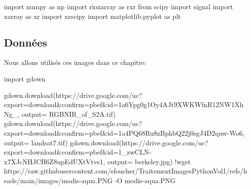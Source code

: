 \documentclass[
  11pt,
  letterpaper,
  open=any,
  twoside=false,
  french]{scrbook}
\newenvironment{Shaded}{\begin{snugshade}}{\end{snugshade}}
\newcommand{\ImportTok}[1]{\textcolor[rgb]{0.00,0.46,0.62}{#1}}
\newcommand{\NormalTok}[1]{\textcolor[rgb]{0.00,0.23,0.31}{#1}}
\newcommand{\OperatorTok}[1]{\textcolor[rgb]{0.37,0.37,0.37}{#1}}
\newcommand{\StringTok}[1]{\textcolor[rgb]{0.13,0.47,0.30}{#1}}
\begin{document}
\begin{Shaded}
\begin{Highlighting}[]
\ImportTok{import}\NormalTok{ numpy }\ImportTok{as}\NormalTok{ np}
\ImportTok{import}\NormalTok{ rioxarray }\ImportTok{as}\NormalTok{ rxr}
\ImportTok{from}\NormalTok{ scipy }\ImportTok{import}\NormalTok{ signal}
\ImportTok{import}\NormalTok{ xarray }\ImportTok{as}\NormalTok{ xr}
\ImportTok{import}\NormalTok{ xrscipy}
\ImportTok{import}\NormalTok{ matplotlib.pyplot }\ImportTok{as}\NormalTok{ plt}
\end{Highlighting}
\end{Shaded}

\subsection{Données}\label{donnuxe9es}

Nous allons utilisés ces images dans ce chapitre:

\begin{Shaded}
\begin{Highlighting}[]
\ImportTok{import}\NormalTok{ gdown}

\NormalTok{gdown.download(}\StringTok{\textquotesingle{}https://drive.google.com/uc?export=download\&confirm=pbef\&id=1a6Ypg0g1Oy4AJt9XWKWfnR12NW1XhNg\_\textquotesingle{}}\NormalTok{, output}\OperatorTok{=} \StringTok{\textquotesingle{}RGBNIR\_of\_S2A.tif\textquotesingle{}}\NormalTok{)}
\NormalTok{gdown.download(}\StringTok{\textquotesingle{}https://drive.google.com/uc?export=download\&confirm=pbef\&id=1a4PQ68Ru8zBphbQ22j0sgJ4D2quw{-}Wo6\textquotesingle{}}\NormalTok{, output}\OperatorTok{=} \StringTok{\textquotesingle{}landsat7.tif\textquotesingle{}}\NormalTok{)}
\NormalTok{gdown.download(}\StringTok{\textquotesingle{}https://drive.google.com/uc?export=download\&confirm=pbef\&id=1\_zwCLN{-}x7XJcNHJCH6Z8upEdUXtVtvs1\textquotesingle{}}\NormalTok{, output}\OperatorTok{=} \StringTok{\textquotesingle{}berkeley.jpg\textquotesingle{}}\NormalTok{)}
\OperatorTok{!}\NormalTok{wget https:}\OperatorTok{//}\NormalTok{raw.githubusercontent.com}\OperatorTok{/}\NormalTok{sfoucher}\OperatorTok{/}\NormalTok{TraitementImagesPythonVol1}\OperatorTok{/}\NormalTok{refs}\OperatorTok{/}\NormalTok{heads}\OperatorTok{/}\NormalTok{main}\OperatorTok{/}\NormalTok{images}\OperatorTok{/}\NormalTok{modis}\OperatorTok{{-}}\NormalTok{aqua.PNG }\OperatorTok{{-}}\NormalTok{O modis}\OperatorTok{{-}}\NormalTok{aqua.PNG}
\end{Highlighting}
\end{Shaded}
\end{document}
